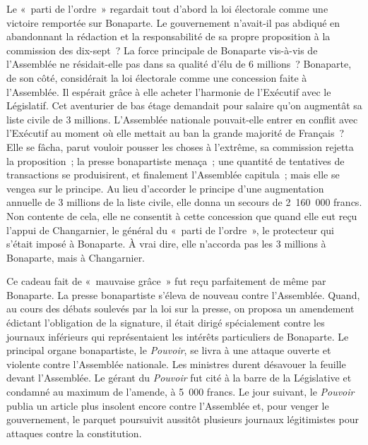 \documentclass[french,twoside]{book} %
\begin{document}
Le « parti de l’ordre » regardait tout d’abord la loi électorale comme une victoire remportée sur Bonaparte. Le gouvernement n’avait-il pas abdiqué en abandonnant la rédaction et la responsabilité de sa propre proposition à la commission des dix-sept ? La force principale de Bonaparte vis-à-vis de l’Assemblée ne résidait-elle pas dans sa qualité d’élu de 6 millions ? Bonaparte, de son côté, considérait la loi électorale comme une concession faite à l’Assemblée. Il espérait grâce à elle acheter l’harmonie de l’Exécutif avec le Législatif. Cet aventurier de bas étage demandait pour salaire qu’on augmentât sa liste civile de 3 millions. L’Assemblée nationale pouvait-elle entrer en conflit avec l’Exécutif au moment où elle mettait au ban la grande majorité de Français ? Elle se fâcha, parut vouloir pousser les choses à l’extrême, sa commission rejetta la proposition ; la presse bonapartiste menaça ; une quantité de tentatives de transactions se produisirent, et finalement l’Assemblée capitula ; mais elle se vengea sur le principe. Au lieu d’accorder le principe d’une augmentation annuelle de 3 millions de la liste civile, elle donna un secours de 2 160 000 francs. Non contente de cela, elle ne consentit à cette concession que quand elle eut reçu l’appui de Changarnier, le général du « parti de l’ordre », le protecteur qui s’était imposé à Bonaparte. À vrai dire, elle n’accorda pas les 3 millions à Bonaparte, mais à Changarnier.\par
Ce cadeau fait de « mauvaise grâce » fut reçu parfaitement de même par Bonaparte. La presse bonapartiste s’éleva de nouveau contre l’Assemblée. Quand, au cours des débats soulevés par la loi sur la presse, on proposa un amendement édictant l’obligation de la signature, il était dirigé spécialement contre les journaux inférieurs qui représentaient les intérêts particuliers de Bonaparte. Le principal organe bonapartiste, le \emph{Pouvoir}, se livra à une attaque ouverte et violente contre l’Assemblée nationale. Les ministres durent désavouer la feuille devant l’Assemblée. Le gérant du \emph{Pouvoir} fut cité à la barre de la Législative et condamné au maximum de l’amende, à 5 000 francs. Le jour suivant, le \emph{Pouvoir} publia un article plus insolent encore contre l’Assemblée et, pour venger le gouvernement, le parquet poursuivit aussitôt plusieurs journaux légitimistes pour attaques contre la constitution.\par
\end{document}
